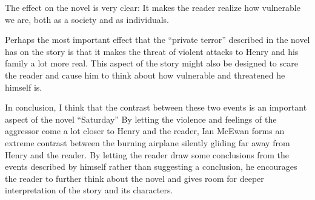 \documentclass[11pt]{article}
\begin{document}
The effect on the novel is very clear: It makes the reader realize how vulnerable we are, both as a society and as individuals.

Perhaps the most important effect that the ``private terror'' described in the novel has on the story is that it makes the threat of violent attacks to Henry and his family a lot more real. This aspect of the story might also be designed to scare the reader and cause him to think about how vulnerable and threatened he himself is.

In conclusion, I think that the contrast between these two events is an important aspect of the novel ``Saturday'' By letting the violence and feelings of the aggressor come a lot closer to Henry and the reader, Ian McEwan forms an extreme contrast between the burning airplane silently gliding far away from Henry and the reader. By letting the reader draw some conclusions from the events described by himself rather than suggesting a conclusion, he encourages the reader to further think about the novel and gives room for deeper interpretation of the story and its characters.
\end{document}
